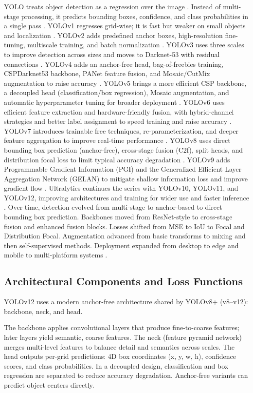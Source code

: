 \documentclass[conference]{IEEEtran}
\begin{document}
YOLO treats object detection as a regression over the image \cite{b1}. Instead of multi-stage processing, it predicts bounding boxes, confidence, and class probabilities in a single pass \cite{b1}. YOLOv1 regresses grid-wise; it is fast but weaker on small objects and localization \cite{b1}. YOLOv2 adds predefined anchor boxes, high-resolution fine-tuning, multiscale training, and batch normalization \cite{b2}. YOLOv3 uses three scales to improve detection across sizes and moves to Darknet-53 with residual connections \cite{b3}. YOLOv4 adds an anchor-free head, bag-of-freebies training, CSPDarknet53 backbone, PANet feature fusion, and Mosaic/CutMix augmentation to raise accuracy \cite{b3}. YOLOv5 brings a more efficient CSP backbone, a decoupled head (classification/box regression), Mosaic augmentation, and automatic hyperparameter tuning for broader deployment \cite{b3}. YOLOv6 uses efficient feature extraction and hardware-friendly fusion, with hybrid-channel strategies and better label assignment to speed training and raise accuracy \cite{b3}. YOLOv7 introduces trainable free techniques, re-parameterization, and deeper feature aggregation to improve real-time performance \cite{b3}. YOLOv8 uses direct bounding box prediction (anchor-free), cross-stage fusion (C2f), split heads, and distribution focal loss to limit typical accuracy degradation \cite{b3}. YOLOv9 adds Programmable Gradient Information (PGI) and the Generalized Efficient Layer Aggregation Network (GELAN) to mitigate shallow information loss and improve gradient flow \cite{b3}. Ultralytics continues the series with YOLOv10, YOLOv11, and YOLOv12, improving architectures and training for wider use and faster inference \cite{b3}. Over time, detection evolved from multi-stage to anchor-based to direct bounding box prediction. Backbones moved from ResNet-style to cross-stage fusion and enhanced fusion blocks. Losses shifted from MSE to IoU to Focal and Distribution Focal. Augmentation advanced from basic transforms to mixing and then self-supervised methods. Deployment expanded from desktop to edge and mobile to multi-platform systems \cite{b3}.

\subsection{Architectural Components and Loss Functions}

YOLOv12 uses a modern anchor-free architecture shared by YOLOv8+ (v8–v12): backbone, neck, and head.

The backbone applies convolutional layers that produce fine-to-coarse features; later layers yield semantic, coarse features. The neck (feature pyramid network) merges multi-level features to balance detail and semantics across scales. The head outputs per-grid predictions: 4D box coordinates (x, y, w, h), confidence scores, and class probabilities. In a decoupled design, classification and box regression are separated to reduce accuracy degradation. Anchor-free variants can predict object centers directly.
\end{document}
